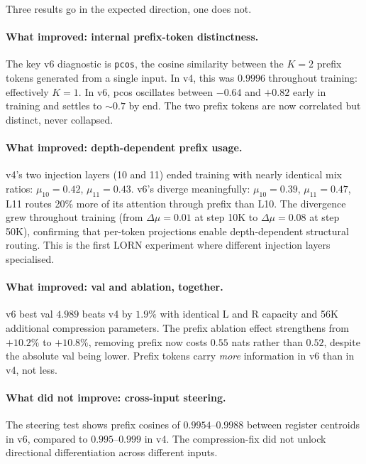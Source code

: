\documentclass[11pt, a4paper]{article}
\theoremstyle{plain}
\theoremstyle{definition}
\theoremstyle{remark}
\begin{document}
Three results go in the expected direction, one does not.

\paragraph{What improved: internal prefix-token distinctness.}
The key v6 diagnostic is \texttt{pcos}, the cosine similarity between the $K{=}2$ prefix tokens generated from a single input.
In v4, this was $0.9996$ throughout training: effectively $K{=}1$.
In v6, pcos oscillates between $-0.64$ and $+0.82$ early in training and settles to $\sim$$0.7$ by end.
The two prefix tokens are now correlated but distinct, never collapsed.

\paragraph{What improved: depth-dependent prefix usage.}
v4's two injection layers (10 and 11) ended training with nearly identical mix ratios: $\mu_{10} = 0.42$, $\mu_{11} = 0.43$.
v6's diverge meaningfully: $\mu_{10} = 0.39$, $\mu_{11} = 0.47$, L11 routes 20\% more of its attention through prefix than L10.
The divergence grew throughout training (from $\Delta\mu = 0.01$ at step 10K to $\Delta\mu = 0.08$ at step 50K), confirming that per-token projections enable depth-dependent structural routing.
This is the first LORN experiment where different injection layers specialised.

\paragraph{What improved: val and ablation, together.}
v6 best val $4.989$ beats v4 by $1.9\%$ with identical L and R capacity and 56K additional compression parameters.
The prefix ablation effect strengthens from $+10.2\%$ to $+10.8\%$, removing prefix now costs $0.55$ nats rather than $0.52$, despite the absolute val being lower.
Prefix tokens carry \emph{more} information in v6 than in v4, not less.

\paragraph{What did not improve: cross-input steering.}
The steering test shows prefix cosines of $0.9954$--$0.9988$ between register centroids in v6, compared to $0.995$--$0.999$ in v4.
The compression-fix did not unlock directional differentiation across different inputs.
\end{document}
